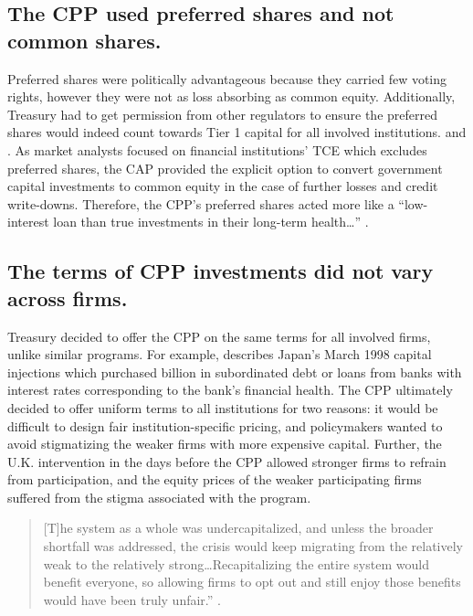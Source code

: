 \documentclass[12pt]{article}
\begin{document}
\subsection{The CPP used preferred shares and not common shares.}

Preferred shares were politically advantageous because they carried few voting rights, however they were not as loss absorbing as common equity. Additionally, Treasury had to get permission from other regulators to ensure the preferred shares would indeed count towards Tier 1 capital for all involved institutions. \citep{paulsonbook} and \citep{FedTier1}. As market analysts focused on financial institutions' TCE which excludes preferred shares, the CAP provided the explicit option to convert government capital investments to common equity in the case of further losses and credit write-downs. Therefore, the CPP's preferred shares acted more like a ``low-interest loan than true investments in their long-term health\dots'' \citep{Geithner}.

\subsection{The terms of CPP investments did not vary across firms.}

Treasury decided to offer the CPP on the same terms for all involved firms, unlike similar programs. For example, \citet{Hoshi} describes Japan's March 1998 capital injections which purchased  billion in subordinated debt or loans from banks with interest rates corresponding to the bank's financial health. The CPP ultimately decided to offer uniform terms to all institutions for two reasons: it would be difficult to design fair institution-specific pricing, and policymakers wanted to avoid stigmatizing the weaker firms with more expensive capital. Further, the U.K. intervention in the days before the CPP allowed stronger firms to refrain from participation, and the equity prices of the weaker participating firms suffered from the stigma associated with the program.
\begin{quote}
[T]he system as a whole was undercapitalized, and unless the broader shortfall was addressed, the crisis would keep migrating from the relatively weak to the relatively strong\dots Recapitalizing the entire system would benefit everyone, so allowing firms to opt out and still enjoy those benefits would have been truly unfair.'' \citep{Geithner}.
\end{quote}
\end{document}
